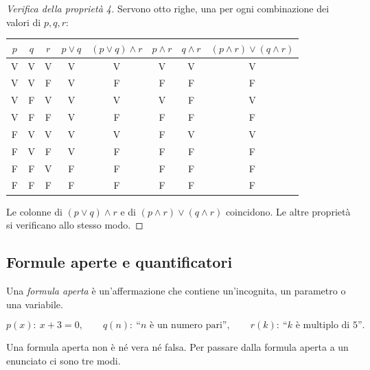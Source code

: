 \documentclass[11pt,a4paper]{article}
\newcommand{\V}{\textsf{V}}
\newcommand{\F}{\textsf{F}}
\begin{document}
\begin{proof}[Verifica della proprietà 4]
Servono otto righe, una per ogni combinazione dei valori di $p, q, r$:
\begin{center}
\begin{tabular}{ccc|c|c|c|c|c}
$p$ & $q$ & $r$ & $p \lor q$ & $(p \lor q) \land r$ & $p \land r$ &
$q \land r$ & $(p \land r) \lor (q \land r)$ \\ \hline
\V & \V & \V & \V & \V & \V & \V & \V \\
\V & \V & \F & \V & \F & \F & \F & \F \\
\V & \F & \V & \V & \V & \V & \F & \V \\
\V & \F & \F & \V & \F & \F & \F & \F \\
\F & \V & \V & \V & \V & \F & \V & \V \\
\F & \V & \F & \V & \F & \F & \F & \F \\
\F & \F & \V & \F & \F & \F & \F & \F \\
\F & \F & \F & \F & \F & \F & \F & \F
\end{tabular}
\end{center}
Le colonne di $(p \lor q) \land r$ e di $(p \land r) \lor (q \land r)$
coincidono. Le altre proprietà si verificano allo stesso modo.
\end{proof}

\subsection{Formule aperte e quantificatori}

\begin{definizione}
Una \emph{formula aperta} è un'affermazione che contiene un'incognita, un
parametro o una variabile.
\end{definizione}

\begin{esempio}
\[
p(x):\ x + 3 = 0, \qquad
q(n):\ \text{``$n$ è un numero pari''}, \qquad
r(k):\ \text{``$k$ è multiplo di $5$''}.
\]
\end{esempio}

Una formula aperta non è né vera né falsa. Per passare dalla formula aperta
a un enunciato ci sono tre modi.
\end{document}
